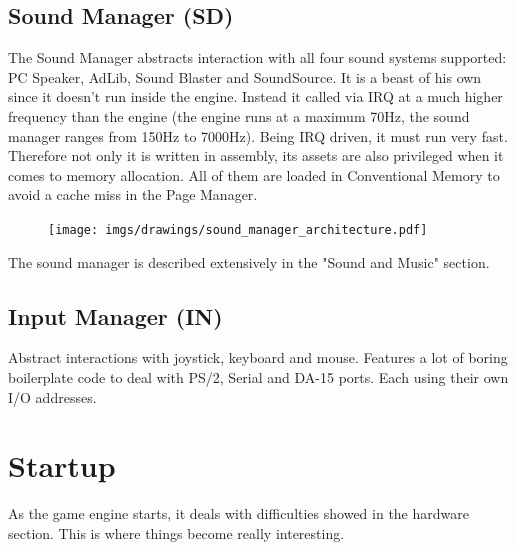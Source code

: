 \documentclass[book.tex]{subfiles}
\begin{document}
\subsection{Sound Manager (SD)}
The Sound Manager abstracts interaction with all four sound systems supported: PC Speaker, AdLib, Sound Blaster and SoundSource. It is a beast of his own since it doesn't run inside the engine. Instead it called via IRQ at a much higher frequency than the engine (the engine runs at a maximum 70Hz, the sound manager ranges from 150Hz to 7000Hz). Being IRQ driven, it must run very fast. Therefore not only it is written in assembly, its assets are also privileged when it comes to memory allocation. All of them are loaded in Conventional Memory to avoid a cache miss in the Page Manager.\\
 \par
\begin{figure}[H]
\centering
 \texttt{[image: imgs/drawings/sound\_manager\_architecture.pdf]}
 \end{figure}
 \par
The sound manager is described extensively in the "Sound and Music" section.

















\subsection{Input Manager (IN)}
Abstract interactions with joystick, keyboard and mouse. Features a lot of boring boilerplate code to deal with PS/2, Serial and DA-15 ports. Each using their own I/O addresses.
















\section{Startup}
As the game engine starts, it deals with difficulties showed in the hardware section. This is where things become really interesting.
\end{document}
